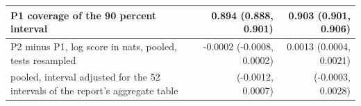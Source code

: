 \begin{tabular}{p{7.4cm}rr}
P1 coverage of the 90 percent interval & 0.894 (0.888, 0.901) & 0.903 (0.901, 0.906) \\
\midrule
P2 minus P1, log score in nats, pooled, tests resampled & -0.0002 (-0.0008, 0.0002) & 0.0013 (0.0004, 0.0021) \\
\quad pooled, interval adjusted for the 52 intervals of the report's aggregate table & (-0.0012, 0.0007) & (-0.0003, 0.0028) \\

\end{tabular}
